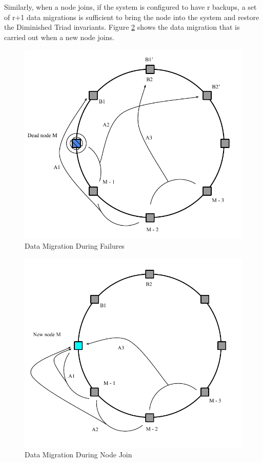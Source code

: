 \documentclass[10pt,twocolumn,letterpaper]{article}
\begin{document}
Similarly, when a node joins, if the system is configured to have r backups,  a set of r+1 data migrations is sufficient to bring the node into the system and restore the Diminished Triad invariants. Figure \ref{handlejoin} shows the data migration that is carried out when a new node joins. 

\begin{figure}[hbt]
  \centering
  \includegraphics[scale=0.4]{handle_dead}
  \caption{Data Migration During Failures}
  \label{handledead}
\end{figure}


\begin{figure}[hbt]
  \centering
  \includegraphics[scale=0.4]{handle_join}
  \caption{Data Migration During Node Join}
  \label{handlejoin}
\end{figure}
\end{document}
